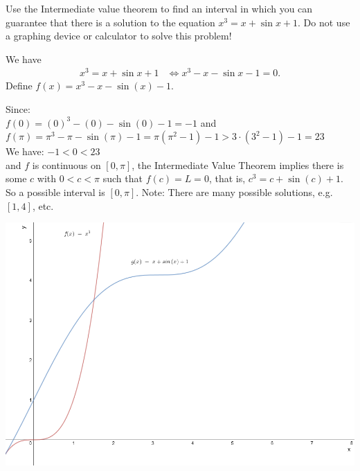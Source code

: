 \documentclass[nooutcomes]{ximera}
\begin{document}
\begin{problem}
  Use the Intermediate value theorem to find an interval in which you can guarantee that there is a solution to the equation $x^3 = x + \sin x + 1$.
  Do not use a graphing device or calculator to solve this problem!
  \begin{freeResponse}
    We have
    \begin{align*}
      x^3 = x + \sin x + 1 &\iff x^3 - x - \sin x - 1 = 0.
    \end{align*}
  Define $f(x) =  x^3 - x - \sin(x) - 1$.

    Since:\\
 $f(0) = (0)^3 - (0) - \sin(0)-1 = -1$ and \\
$f(\pi) = \pi^3 - \pi - \sin(\pi)-1 = \pi(\pi^2 - 1) - 1 > 3 \cdot (3^2 - 1) - 1 = 23$\\
We have: $-1<0<23$\\
and $f$ is continuous on $[0, \pi]$, the Intermediate Value Theorem implies there is some $c$ with $0 < c < \pi$ such that $f(c)=L= 0$, that is, $c^3 = c + \sin (c) + 1$.  So a possible interval is $[0,\pi]$.  Note: There are many possible solutions, e.g. $[1,4]$, etc.

	\begin{image}
	\includegraphics[scale=.5]{Figure3.png}
	\end{image}


  \end{freeResponse}
\end{problem}
	
\end{document}
